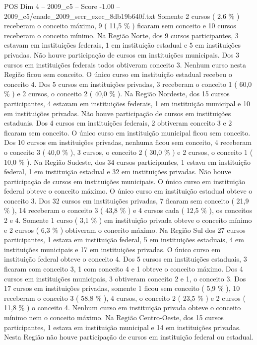 \begin{textsample}{POS Dim 4 – 2009\_c5 – Score -1.00 – 2009\_c5/enade\_2009\_secr\_exec\_8db19b640f.txt}
Somente 2 cursos ( 2,6 \% ) receberam o conceito máximo, 9 ( 11,5 \% ) ficaram sem conceito e 10 cursos receberam o conceito mínimo.
Na Região Norte, dos 9 cursos participantes, 3 estavam em instituições federais, 1 em instituição estadual e 5 em instituições privadas.
Não houve participação de cursos em instituições municipais.
Dos 3 cursos em instituições federais todos obtiveram conceito 3.
Nenhum curso nesta Região ficou sem conceito.
O único curso em instituição estadual recebeu o conceito 4.
Dos 5 cursos em instituições privadas, 3 receberam o conceito 1 ( 60,0 \% ) e 2 cursos, o conceito 2 ( 40,0 \% ).
Na Região Nordeste, dos 15 cursos participantes, 4 estavam em instituições federais, 1 em instituição municipal e 10 em instituições privadas.
Não houve participação de cursos em instituições estaduais.
Dos 4 cursos em instituições federais, 2 obtiveram conceito 3 e 2 ficaram sem conceito.
O único curso em instituição municipal ficou sem conceito.
Dos 10 cursos em instituições privadas, nenhuma ficou sem conceito, 4 receberam o conceito 3 ( 40,0 \% ), 3 cursos, o conceito 2 ( 30,0 \% ) e 2 cursos, o conceito 1 ( 10,0 \% ).
Na Região Sudeste, dos 34 cursos participantes, 1 estava em instituição federal, 1 em instituição estadual e 32 em instituições privadas.
Não houve participação de cursos em instituições municipais.
O único curso em instituição federal obteve o conceito máximo.
O único curso em instituição estadual obteve o conceito 3.
Dos 32 cursos em instituições privadas, 7 ficaram sem conceito ( 21,9 \% ), 14 receberam o conceito 3 ( 43,8 \% ) e 4 cursos cada ( 12,5 \% ), os conceitos 2 e 4.
Somente 1 curso ( 3,1 \% ) em instituição privada obteve o conceito mínimo e 2 cursos ( 6,3 \% ) obtiveram o conceito máximo.
Na Região Sul dos 27 cursos participantes, 1 estava em instituição federal, 5 em instituições estaduais, 4 em instituições municipais e 17 em instituições privadas.
O único curso em instituição federal obteve o conceito 4.
Dos 5 cursos em instituições estaduais, 3 ficaram com conceito 3, 1 com conceito 4 e 1 obteve o conceito máximo.
Dos 4 cursos em instituições municipais, 3 obtiveram conceito 2 e 1, o conceito 3.
Dos 17 cursos em instituições privadas, somente 1 ficou sem conceito ( 5,9 \% ), 10 receberam o conceito 3 ( 58,8 \% ), 4 cursos, o conceito 2 ( 23,5 \% ) e 2 cursos ( 11,8 \% ) o conceito 4.
Nenhum curso em instituição privada obteve o conceito mínimo nem o conceito máximo.
Na Região Centro-Oeste, dos 15 cursos participantes, 1 estava em instituição municipal e 14 em instituições privadas.
Nesta Região não houve participação de cursos em instituição federal ou estadual.

\end{textsample}
